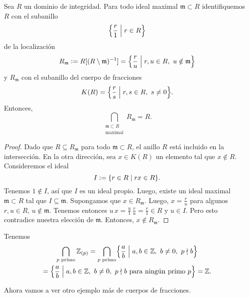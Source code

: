 \begin{proposicion}
  Sea $R$ un dominio de integridad. Para todo ideal maximal
  $\mathfrak{m} \subset R$ identifiquemos $R$ con el subanillo
  $$\Bigl\{ \frac{r}{1} \Bigm| r\in R \Bigr\}$$
  de la localización
  \[ R_\mathfrak{m} \mathrel{\mathop:}= R [(R\setminus\mathfrak{m})^{-1}] =
     \Bigl\{ \frac{r}{u} \Bigm| r,u\in R, ~ u\notin\mathfrak{m} \Bigr\} \]
  y $R_\mathfrak{m}$ con el subanillo del cuerpo de fracciones
  $$K (R) = \Bigl\{ \frac{r}{s} \Bigm| r,s\in R, ~ s\ne 0 \Bigr\}.$$
  Entonces,
  \[ \bigcap_{\substack{\mathfrak{m}\subset R \\ \text{maximal}}} R_\mathfrak{m}
     = R. \]

  \begin{proof}
    Dado que $R \subseteq R_\mathfrak{m}$ para todo $\mathfrak{m} \subset R$,
    el anillo $R$ está incluido en la intersección. En la otra dirección,
    sea $x\in K (R)$ un elemento tal que $x \notin R$. Consideremos el ideal
    $$I \mathrel{\mathop:}= \{ r\in R \mid rx \in R \}.$$
    Tenemos $1 \notin I$, así que $I$ es un ideal propio. Luego, existe un ideal
    maximal $\mathfrak{m} \subset R$ tal que $I \subseteq
    \mathfrak{m}$. Supongamos que $x \in R_\mathfrak{m}$. Luego,
    $x = \frac{r}{u}$ para algunos $r,u\in R$, $u \notin \mathfrak{m}$. Tenemos
    entonces $u\,x = \frac{u}{1}\,\frac{r}{u} = \frac{r}{1} \in R$ y
    $u\in I$. Pero esto contradice nuestra elección de $\mathfrak{m}$. Entonces,
    $x\notin R_\mathfrak{m}$.
  \end{proof}
\end{proposicion}

\begin{ejemplo}
  Tenemos
  \begin{multline*}
    \bigcap_{p\text{ primo}} \mathbb{Z}_{(p)} =
    \bigcap_{p\text{ primo}} \Bigl\{ \frac{a}{b} \Bigm| a,b\in \mathbb{Z}, ~ b\ne 0, ~ p\nmid b \Bigr\} \\
    = \Bigl\{ \frac{a}{b} \Bigm| a,b\in \mathbb{Z}, ~ b\ne 0, ~ p\nmid b \text{ para ningún primo }p \Bigr\} = \mathbb{Z}. \qedhere
  \end{multline*}
\end{ejemplo}

Ahora vamos a ver otro ejemplo más de cuerpos de fracciones.


